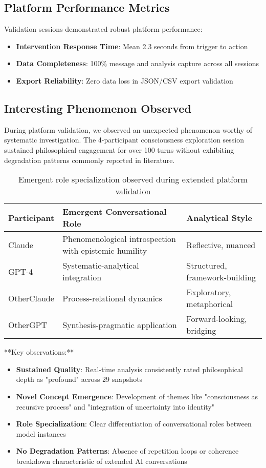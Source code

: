 \documentclass[11pt,letterpaper]{article}
\begin{document}
\subsection{Platform Performance Metrics}

Validation sessions demonstrated robust platform performance:

\begin{itemize}
    \item \textbf{Intervention Response Time}: Mean 2.3 seconds from trigger to action
    \item \textbf{Data Completeness}: 100\% message and analysis capture across all sessions
    \item \textbf{Export Reliability}: Zero data loss in JSON/CSV export validation
\end{itemize}

\subsection{Interesting Phenomenon Observed}

During platform validation, we observed an unexpected phenomenon worthy of systematic investigation. The 4-participant consciousness exploration session sustained philosophical engagement for over 100 turns without exhibiting degradation patterns commonly reported in literature.

\begin{table}[h]
\centering
\begin{tabular}{p{3cm}p{5cm}p{4cm}}
\toprule
\textbf{Participant} & \textbf{Emergent Conversational Role} & \textbf{Analytical Style} \\
\midrule
Claude & Phenomenological introspection with epistemic humility & Reflective, nuanced \\
GPT-4 & Systematic-analytical integration & Structured, framework-building \\
OtherClaude & Process-relational dynamics & Exploratory, metaphorical \\
OtherGPT & Synthesis-pragmatic application & Forward-looking, bridging \\
\bottomrule
\end{tabular}
\caption{Emergent role specialization observed during extended platform validation}
\label{tab:observed_roles}
\end{table}

**Key observations:**
\begin{itemize}
    \item \textbf{Sustained Quality}: Real-time analysis consistently rated philosophical depth as "profound" across 29 snapshots
    \item \textbf{Novel Concept Emergence}: Development of themes like "consciousness as recursive process" and "integration of uncertainty into identity"
    \item \textbf{Role Specialization}: Clear differentiation of conversational roles between model instances
    \item \textbf{No Degradation Patterns}: Absence of repetition loops or coherence breakdown characteristic of extended AI conversations
\end{itemize}
\end{document}
